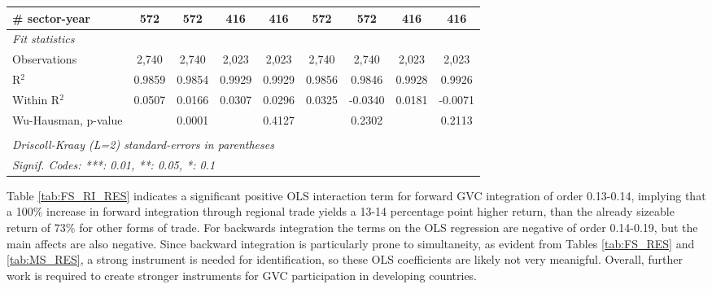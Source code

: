 \documentclass[a4paper]{article}
\begin{document}
\begin{table}[h!]
{\begin{tabular}{lcccccccc}
      \# sector-year                                 & 572            & 572                    & 416            & 416                     & 572            & 572                    & 416            & 416\\ 
            \midrule
      \emph{Fit statistics}\\
      Observations                                   & 2,740          & 2,740                  & 2,023          & 2,023                   & 2,740          & 2,740                  & 2,023          & 2,023\\  
      R$^2$                                          & 0.9859         & 0.9854                 & 0.9929         & 0.9929                  & 0.9856         & 0.9846                 & 0.9928         & 0.9926\\  
      Within R$^2$                                   & 0.0507         & 0.0166                 & 0.0307         & 0.0296                  & 0.0325         & -0.0340                & 0.0181         & -0.0071\\  
      Wu-Hausman, p-value                            &                & 0.0001                 &                & 0.4127                  &                & 0.2302                 &                & 0.2113\\
      \bottomrule \\ [-0.9em]
      \multicolumn{9}{l}{\emph{Driscoll-Kraay (L=2) standard-errors in parentheses}}\\
      \multicolumn{9}{l}{\emph{Signif. Codes: ***: 0.01, **: 0.05, *: 0.1}}\\
   \end{tabular}
   }
\end{table}
\FloatBarrier


Table \ref{tab:FS_RI_RES} indicates a significant positive OLS interaction term for forward GVC integration of order 0.13-0.14, implying that a 100\% increase in forward integration through regional trade yields a 13-14 percentage point higher return, than the already sizeable return of 73\% for other forms of trade. For backwards integration the terms on the OLS regression are negative of order 0.14-0.19, but the main affects are also negative. Since backward integration is particularly prone to simultaneity, as evident from Tables \ref{tab:FS_RES} and \ref{tab:MS_RES}, a strong instrument is needed for identification, so these OLS coefficients are likely not very meanigful. Overall, further work is required to create stronger instruments for GVC participation in developing countries. 
\end{document}

